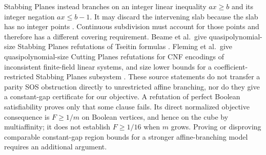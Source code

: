 Stabbing Planes instead branches on an integer linear inequality
$ax\ge b$ and its integer negation $ax\le b-1$. It may discard the
intervening slab because the slab has no integer points
\citep[Section 1]{BeameEtAl2023}. Continuous subdivision must account
for those points and therefore has a different covering requirement.
Beame et al.\ give quasipolynomial-size Stabbing Planes refutations of
Tseitin formulas \citep[Theorem 1]{BeameEtAl2023}. Fleming et al.\ give
quasipolynomial-size Cutting Planes refutations for CNF encodings of
inconsistent finite-field linear systems, and size lower bounds for a
coefficient-restricted Stabbing Planes subsystem
\citep[Theorems 1.3--1.4]{FlemingEtAl2021}. These source statements do
not transfer a parity SOS obstruction directly to unrestricted affine
branching, nor do they give a constant-gap certificate for our objective.
A refutation of perfect Boolean satisfiability proves only that some
clause fails. Its direct normalized objective consequence is $F\ge1/m$
on Boolean vertices, and hence on the cube by multiaffinity; it does not
establish $F\ge1/16$ when $m$ grows. Proving or disproving comparable
constant-gap region bounds for a stronger affine-branching model requires
an additional argument.
